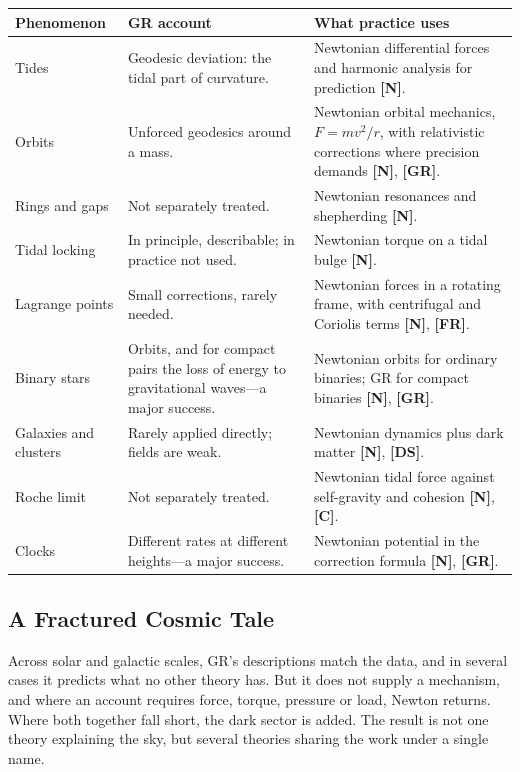 \documentclass[11pt,a4paper]{article}
\newcommand{\reg}[1]{\textsf{\small\textbf{[#1]}}}
\newcommand{\RN}{\reg{N}}
\newcommand{\RGR}{\reg{GR}}
\newcommand{\RFR}{\reg{FR}}
\newcommand{\RC}{\reg{C}}
\newcommand{\RDS}{\reg{DS}}
\begin{document}
\begin{longtable}{>{\raggedright\arraybackslash}p{3.3cm}>{\raggedright\arraybackslash}p{5.3cm}>{\raggedright\arraybackslash}p{5.2cm}}
\toprule
\textbf{Phenomenon} & \textbf{GR account} & \textbf{What practice uses} \\
\midrule
\endhead
Tides & Geodesic deviation: the tidal part of curvature. & Newtonian differential forces and harmonic analysis for prediction \RN{}. \\[3pt]
Orbits & Unforced geodesics around a mass. & Newtonian orbital mechanics, $F = mv^2/r$, with relativistic corrections where precision demands \RN{}, \RGR{}. \\[3pt]
Rings and gaps & Not separately treated. & Newtonian resonances and shepherding \RN{}. \\[3pt]
Tidal locking & In principle, describable; in practice not used. & Newtonian torque on a tidal bulge \RN{}. \\[3pt]
Lagrange points & Small corrections, rarely needed. & Newtonian forces in a rotating frame, with centrifugal and Coriolis terms \RN{}, \RFR{}. \\[3pt]
Binary stars & Orbits, and for compact pairs the loss of energy to gravitational waves---a major success. & Newtonian orbits for ordinary binaries; GR for compact binaries \RN{}, \RGR{}. \\[3pt]
Galaxies and clusters & Rarely applied directly; fields are weak. & Newtonian dynamics plus dark matter \RN{}, \RDS{}. \\[3pt]
Roche limit & Not separately treated. & Newtonian tidal force against self-gravity and cohesion \RN{}, \RC{}. \\[3pt]
Clocks & Different rates at different heights---a major success. & Newtonian potential in the correction formula \RN{}, \RGR{}. \\
\bottomrule
\end{longtable}

\subsection{A Fractured Cosmic Tale}

Across solar and galactic scales, GR's descriptions match the data, and in several cases it predicts what no other theory has. But it does not supply a mechanism, and where an account requires force, torque, pressure or load, Newton returns. Where both together fall short, the dark sector is added. The result is not one theory explaining the sky, but several theories sharing the work under a single name.
\end{document}
